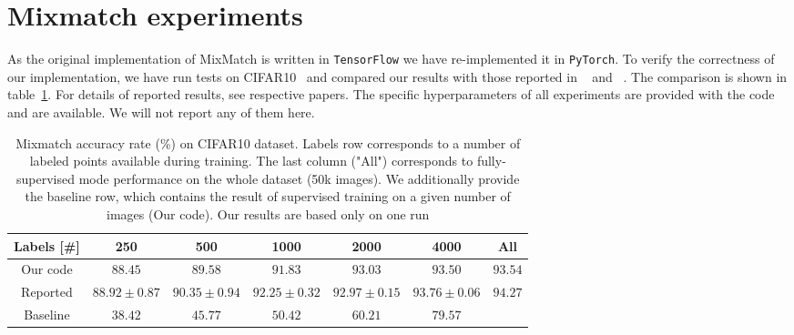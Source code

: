 \section{Mixmatch experiments}
As the original implementation of MixMatch is written in \texttt{TensorFlow} we have re-implemented it in \texttt{PyTorch}. To verify the correctness
 of our implementation, we have run tests on CIFAR10~\cite{cifar10-2009} and compared our results with those reported in ~\cite{mixmatch-2019} and ~\cite{wide-resnet-2017}. The 
comparison is shown in table~\ref{tab:mixmatch-cifar10}. For details of reported results, see respective papers. 
The specific hyperparameters of all experiments are provided with the code and are available. We will not report any of them here.
 
\begin{table}[tbh]
    \begin{tabular}{|c|c|c|c|c|c|c|}
    \hline
    Labels [\#]  & 250 & 500 & 1000 & 2000 & 4000 & All \\
    \hline
    Our code & $88.45$ & $89.58$& $91.83$ & $93.03$ & $93.50$ & $93.54$\\
    \hline
    Reported & $88.92\pm0.87$ & $90.35\pm0.94$ & $92.25\pm0.32$ & $92.97\pm0.15$ & $93.76\pm 0.06$ & $94.27$\\
    \hline 
    Baseline & $38.42$ & $45.77$ & $50.42$ & $60.21$ & $79.57$ &  \\
    \hline
    \end{tabular}
    \caption[Mixmatch accuracy on CIFAR10]{Mixmatch accuracy rate (\%) on CIFAR10 dataset. Labels row corresponds to a number of labeled points available during training. 
    The last column ("All") corresponds to fully-supervised mode performance on the whole dataset (50k images).
    We additionally provide the baseline row, which contains the result of supervised training on a given number of images (Our code).
    Our results are based only on one run}
    \label{tab:mixmatch-cifar10}
\end{table}

